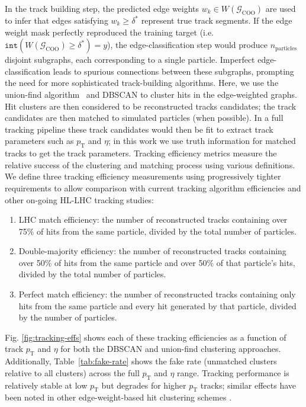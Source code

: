 \documentclass[twocolumn]{svjour3}
\newcommand{\pt}{\ensuremath{p_{\mathrm{T}}}\xspace}
\begin{document}
In the track building step, the predicted edge weights $w_k\in W(\mathcal{G}_\mathrm{COO})$ are used to infer that edges satisfying $w_k\geq\delta^*$ represent true track segments. 
If the edge weight mask perfectly reproduced the training target (i.e. $\mathtt{int}(W(\mathcal{G}_\mathrm{COO})\geq\delta^*)=y$), the edge-classification step would produce $n_\mathrm{particles}$ disjoint subgraphs, each corresponding to a single particle. 
Imperfect edge-classification leads to spurious connections between these subgraphs, prompting the need for more sophisticated track-building algorithms. 
Here, we use the union-find algorithm~\cite{unionfind} and DBSCAN to cluster hits in the edge-weighted graphs. 
Hit clusters are then considered to be reconstructed tracks candidates; the track candidates are then matched to simulated particles (when possible). In a full tracking pipeline these track candidates would then be fit to extract track parameters such as $\pt$ and $\eta$; in this work we use truth information for matched tracks to get the track parameters.
Tracking efficiency metrics measure the relative success of the clustering and matching process using various definitions. 
We define three tracking efficiency measurements using progressively tighter requirements to allow comparison with current tracking algorithm efficiencies and other on-going HL-LHC tracking studies:
\begin{enumerate}
    \item LHC match efficiency: the number of reconstructed tracks containing over 75\% of hits from the same particle, divided by the total number of particles.
    \item Double-majority efficiency: the number of reconstructed tracks containing over 50\% of hits from the same particle and over 50\% of that particle's hits, divided by the total number of particles.
    \item Perfect match efficiency: the number of reconstructed tracks containing only hits from the same particle and every hit generated by that particle, divided by the number of particles.
\end{enumerate}
Fig. \ref{fig:tracking-effs} shows each of these tracking efficiencies as a function of track $\pt$ and $\eta$ for both the DBSCAN and union-find clustering approaches. 
Additionally, Table~\ref{tab:fake-rate} shows the fake rate (unmatched clusters relative to all clusters) across the full $\pt$ and $\eta$ range. 
Tracking performance is relatively stable at low $\pt$ but degrades for higher $\pt$ tracks; similar effects have been noted in other edge-weight-based hit clustering schemes \cite{Biscarat:2021dlj}. 
\end{document}
